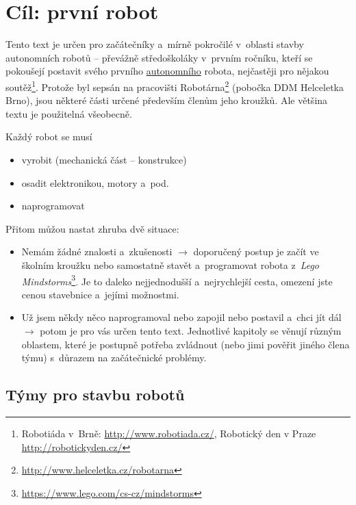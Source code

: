 \section{Cíl: první robot}

Tento
text je určen pro začátečníky a~mírně pokročilé v~oblasti stavby autonomních robotů -- převážně středoškoláky v~prvním ročníku, kteří se pokoušejí postavit svého prvního \hyperlink{autonomni}{autonomního}
robota, nejčastěji pro nějakou soutěž\footnote{Robotiáda v~Brně: 
\url{http://www.robotiada.cz/}, Robotický den v Praze \url{http://robotickyden.cz/} }. 
Protože byl sepsán na pracovišti Robotárna\footnote{\url{http://www.helceletka.cz/robotarna}} (pobočka DDM Helceletka Brno), jsou některé části určené především členům jeho kroužků. Ale většina textu je použitelná všeobecně.

Každý robot se musí 
\begin{itemize} 	%
\item vyrobit (mechanická část -- konstrukce)
\item osadit elektronikou, motory a~pod.
\item naprogramovat 
\end{itemize}

Přitom můžou nastat zhruba dvě situace:

\begin{itemize} %
\item  Nemám žádné znalosti a~zkušenosti $\rightarrow$ doporučený 
postup je začít ve školním kroužku nebo samostatně stavět a~programovat 
robota z~{\it Lego Mindstorms}\footnote{\url{https://www.lego.com/cs-cz/mindstorms}}.
Je to daleko nejjednodušší a~nejrychlejší cesta, omezení jste cenou stavebnice a~jejími možnostmi.
\item  Už jsem někdy něco naprogramoval nebo zapojil nebo postavil a~chci jít dál $\rightarrow$ potom je pro vás určen tento text.
Jednotlivé kapitoly se věnují různým oblastem, které je postupně potřeba zvládnout (nebo jimi pověřit jiného člena týmu) s~důrazem na začátečnické problémy.
\end{itemize}

\subsection{Týmy pro stavbu robotů}

